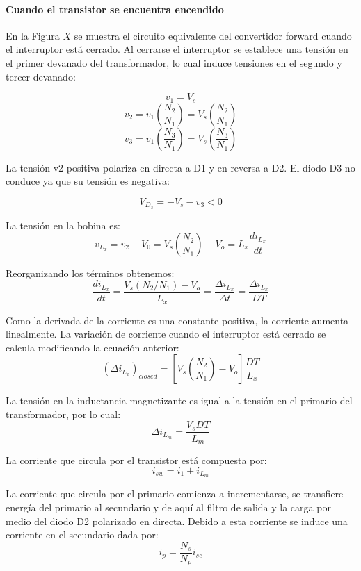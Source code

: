 
\paragraph{Cuando el transistor se encuentra encendido}

En la Figura $X$ se muestra el circuito equivalente del convertidor forward cuando el interruptor
está cerrado. Al cerrarse el interruptor se establece una tensión en el primer devanado del transformador,
lo cual induce tensiones en el segundo y tercer devanado:

$$ v_1=V_s $$
$$ v_2=v_1\left(\frac{N_2}{N_1}\right)=V_s\left(\frac{N_2}{N_1}\right) $$
$$ v_3=v_1\left(\frac{N_3}{N_1}\right)=V_s\left(\frac{N_3}{N_1}\right) $$

La tensión v2 positiva polariza en directa a D1 y en reversa a D2. El diodo D3 no conduce ya que su tensión es negativa:

$$ V_{D_3}=-V_s-v_3<0 $$

La tensión en la bobina es:
$$ v_{L_x}=v_2-V_0=V_s\left(\frac{N_2}{N_1}\right)-V_o=L_x\frac{di_{L_x}}{dt} $$

Reorganizando los términos obtenemos:
$$ \frac{di_{L_x}}{dt}=\frac{V_s(N_2/N_1)-V_o}{L_x}=\frac{\Delta i_{L_x}}{\Delta t}=\frac{\Delta i_{L_x}}{DT} $$

Como la derivada de la corriente es una constante positiva, la corriente aumenta linealmente. 
La variación de corriente cuando el interruptor está cerrado se calcula modificando la ecuación anterior:
$$ (\Delta i_{L_x})_{closed}=\left[V_s\left(\frac{N_2}{N_1}\right)-V_o\right]\frac{DT}{L_x} $$

La tensión en la inductancia magnetizante es igual a la tensión en el primario del transformador, por lo cual:
$$ \Delta i_{L_m}=\frac{V_sDT}{L_m} $$

La corriente que circula por el transistor está compuesta por:
$$ i_{sw}=i_1+i_{L_m} $$


La corriente que circula por el primario comienza a incrementarse,
se transfiere energía del primario al secundario y de aquí al filtro de salida y la carga por medio del diodo D2 polarizado en directa. 
Debido a esta corriente se induce una corriente en el secundario dada por:
$$ i_p=\frac{N_s}{N_p}i_{se} $$


